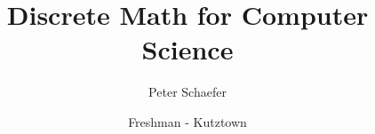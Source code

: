 



\title{Discrete Math for Computer Science}
\author{Peter Schaefer}
\date{Freshman - Kutztown}



\maketitle
\tableofcontents
\newpage
















